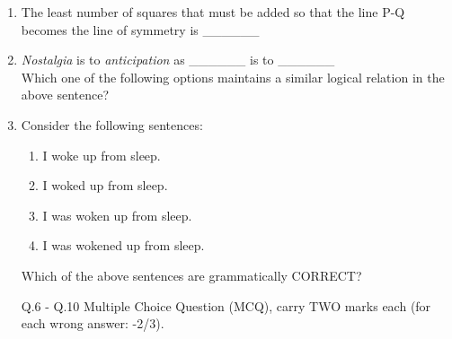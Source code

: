 \documentclass[journal]{IEEEtran}
\begin{document}
\begin{enumerate}[start=1]
\item The least number of squares that must be added so that the line P-Q becomes the line of symmetry is \_\_\_\_\_\_
\hfill{}
\begin{enumerate}
\end{enumerate}

\item \textit{Nostalgia} is to \textit{anticipation} as \_\_\_\_\_\_ is to \_\_\_\_\_\_ \\
Which one of the following options maintains a similar logical relation in the above sentence?
\hfill{}
\begin{enumerate}
\end{enumerate}

\item Consider the following sentences:
\begin{enumerate}[label=(\roman*)]
    \item I woke up from sleep.
    \item I woked up from sleep.
    \item I was woken up from sleep.
    \item I was wokened up from sleep.
\end{enumerate}
Which of the above sentences are grammatically CORRECT?
\hfill{}
\begin{enumerate}
\end{enumerate}

Q.6 - Q.10 Multiple Choice Question (MCQ), carry TWO marks each (for each wrong answer: -2/3).\\


\end{enumerate}
\end{document}
